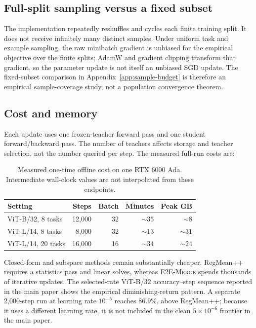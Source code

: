 \documentclass[letterpaper]{article} %
\newcommand{\method}{\textup{\textsc{E2E-Merge}}\xspace}
\theoremstyle{plain}
\theoremstyle{definition}
\begin{document}
\subsection{Full-split sampling versus a fixed subset}
The implementation repeatedly reshuffles and cycles each finite training split.
It does not receive infinitely many distinct samples.
Under uniform task and example sampling, the raw minibatch gradient is unbiased for the empirical objective over the finite splits; AdamW and gradient clipping transform that gradient, so the parameter update is not itself an unbiased SGD update.
The fixed-subset comparison in Appendix~\ref{app:sample-budget} is therefore an empirical sample-coverage study, not a population convergence theorem.

\subsection{Cost and memory}
\label{app:cost}
Each update uses one frozen-teacher forward pass and one student forward/backward pass.
The number of teachers affects storage and teacher selection, not the number queried per step.
The measured full-run costs are:

\begin{table}[!ht]
\centering
{\small
\begin{tabular*}{\columnwidth}{@{\extracolsep{\fill}}lrrrr}
\toprule
Setting & Steps & Batch & Minutes & Peak GB \\
\midrule
ViT-B/32, 8 tasks & 12,000 & 32 & $\sim35$ & $\sim8$ \\
ViT-L/14, 8 tasks & 8,000 & 32 & $\sim13$ & $\sim31$ \\
ViT-L/14, 20 tasks & 16,000 & 16 & $\sim34$ & $\sim24$ \\
\bottomrule
\end{tabular*}
}
\caption{Measured one-time offline cost on one RTX 6000 Ada. Intermediate
wall-clock values are not interpolated from these endpoints.}
\label{tab:cost-app}
\end{table}

Closed-form and subspace methods remain substantially cheaper.
RegMean++ requires a statistics pass and linear solves, whereas \method spends thousands of iterative updates.
The selected-rate ViT-B/32 accuracy--step sequence reported in the main paper shows the empirical diminishing-return pattern.
A separate 2,000-step run at learning rate $10^{-5}$ reaches $86.9\%$, above RegMean++; because it uses a different learning rate, it is not included in the clean $5\times10^{-6}$ frontier in the main paper.
\end{document}
